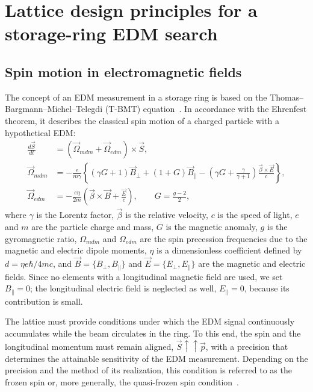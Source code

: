 \section{Lattice design principles for a storage-ring EDM search}
\label{sec:principles}

\subsection{Spin motion in electromagnetic fields}

The concept of an EDM measurement in a storage ring is based on the
Thomas--Bargmann--Michel--Telegdi (T-BMT)
equation~\cite{Bargmann:1959gz,Fukuyama:2013ioa}. In accordance with the
Ehrenfest theorem, it describes the classical spin motion of a charged particle
with a hypothetical EDM:
\begin{equation}
\begin{aligned}
  \frac{d\vec{S}}{dt} &= \left(\vec{\Omega}_{mdm} + \vec{\Omega}_{edm}\right)\times\vec{S},\\
  \vec{\Omega}_{mdm} &= -\frac{e}{m\gamma}\left\{(\gamma G+1)\vec{B}_{\perp}
     + (1+G)\vec{B}_{\parallel}
     - \left(\gamma G+\frac{\gamma}{\gamma+1}\right)\frac{\vec{\beta}\times\vec{E}}{c}\right\},\\
  \vec{\Omega}_{edm} &= -\frac{e\eta}{2m}\left(\vec{\beta}\times\vec{B}+\frac{\vec{E}}{c}\right),
  \qquad G = \frac{g-2}{2},
\end{aligned}
\label{eq:tbmt}
\end{equation}
where $\gamma$ is the Lorentz factor, $\vec{\beta}$ is the relative velocity,
$c$ is the speed of light, $e$ and $m$ are the particle charge and mass, $G$ is
the magnetic anomaly, $g$ is the gyromagnetic ratio, $\Omega_{mdm}$ and
$\Omega_{edm}$ are the spin precession frequencies due to the magnetic and
electric dipole moments, $\eta$ is a dimensionless coefficient defined by
$d = \eta e\hbar/4mc$, and $\vec{B}=\{B_\perp, B_\parallel\}$ and
$\vec{E}=\{E_\perp, E_\parallel\}$ are the magnetic and electric fields. Since
no elements with a longitudinal magnetic field are used, we set
$B_\parallel = 0$; the longitudinal electric field is neglected as well,
$E_\parallel = 0$, because its contribution is small.

The lattice must provide conditions under which the EDM signal continuously
accumulates while the beam circulates in the ring. To this end, the spin and
the longitudinal momentum must remain aligned, $\vec{S}\uparrow\uparrow\vec{p}$,
with a precision that determines the attainable sensitivity of the EDM
measurement. Depending on the precision and the method of its realization,
this condition is referred to as the frozen spin or, more generally, the
quasi-frozen spin condition~\cite{Senichev:2016rez}.

